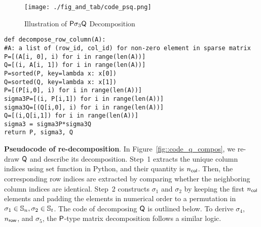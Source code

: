 \begin{figure}[!t]
	\centering
	\texttt{[image: ./fig\_and\_tab/code\_psq.png]}
	\caption{Illustration of $\mathsf{P}\sigma_3\mathsf{Q}$ Decomposition}
	 \label{fig::code_psigq_de}
\end{figure}



\noindent
\begin{frame}{\texttt{def decompose\_row\_column(A):}}
 \\\texttt{\#A: a list of (row\_id, col\_id) for non-zero element in sparse matrix}
\\\indent\texttt{P=[(A[i, 0], i) for i in range(len(A))]}
\\\indent\texttt{Q=[(i, A[i, 1]) for i in range(len(A))]}
\\\indent\texttt{P=sorted(P, key=lambda x: x[0])}
\\\indent\texttt{Q=sorted(Q, key=lambda x: x[1])}
\\\indent\texttt{P=[(P[i,0], i) for i in range(len(A))]}
\\\indent\texttt{sigma3P=[(i, P[i,1]) for i in range(len(A))]}
\\\indent\texttt{sigma3Q=[(Q[i,0], i) for i in range(len(A))]}
\\\indent\texttt{Q=[(i,Q[i,1]) for i in range(len(A))] }
\\\indent\texttt{sigma3 = sigma3P*sigma3Q}
\\\indent\texttt{return P, sigma3, Q}
\end{frame}	


\noindent\textbf{Pseudocode of re-decomposition}.
In Figure~\ref{fig::code_q_compos}, we re-draw $\mathsf{Q}$ and describe its decomposition.
Step~1 extracts the unique column indices using $\text{set}$ function in Python, and their quantity is $n_{\mathsf{col}}$.
Then, the corresponding row indices are extracted by comparing whether the neighboring column indices are identical.
Step~2 constructs $\sigma_1$ and $\sigma_2$ by keeping the first $n_{\mathsf{col}}$ elements and padding the elements in numerical order to a permutation in $\sigma_1\in\mathbb{S}_n,\sigma_2\in\mathbb{S}_t$.
The code of decomposing $\mathsf{Q}$ is outlined below.
To derive $\sigma_4$, $n_{\mathsf{row}}$, and $\sigma_5$, the $\mathsf{P}$-type matrix decomposition follows a similar logic.

